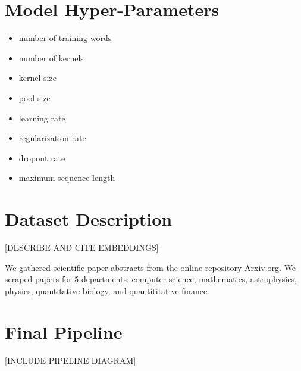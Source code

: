 \section{Model Hyper-Parameters}
\begin{itemize}
  \item number of training words
  \item number of kernels
  \item kernel size
  \item pool size
  \item learning rate
  \item regularization rate
  \item dropout rate
  \item maximum sequence length

\end{itemize}

\section{Dataset Description}
[DESCRIBE AND CITE EMBEDDINGS]

We gathered scientific paper abstracts from the online repository Arxiv.org.
We scraped papers for 5 departments: computer science, mathematics, astrophysics, physics, quantitative biology, and quantititative finance.

\section{Final Pipeline}
[INCLUDE PIPELINE DIAGRAM]

